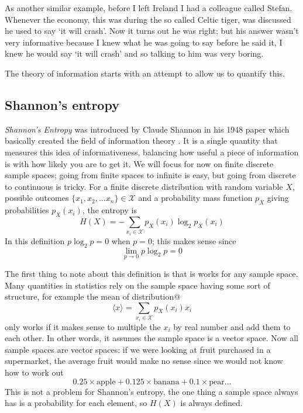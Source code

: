 \documentclass[12pt]{article}
\begin{document}
As another similar example, before I left Ireland I had a colleague
called Stefan. Whenever the economy, this was during the so called
Celtic tiger, was discussed he used to say \lq{}it will
crash\rq{}. Now it turns out he was right; but his answer wasn't very
informative because I knew what he was going to say before he said it,
I knew he would say \lq{}it will crash\rq{} and so talking to him was
very boring. 

The theory of information starts with an attempt to allow us to
quantify this. 

\subsection*{Shannon's entropy}


\textsl{Shannon's Entropy} was introduced by Claude Shannon in his
1948 paper which basically created the field of information theory
\citep{Shannon1948}. It is a single quantity that measures this idea of
informativeness, balancing how useful a piece of information is with
how likely you are to get it. We will focus for now on finite discrete
sample spaces; going from finite spaces to infinite is easy, but going
from discrete to continuous is tricky. For a finite discrete
distribution with random variable $X$, possible outcomes
$\{x_1,x_2,\ldots x_n\}\in\mathcal{X}$ and a probability mass function
$p_X$ giving probabilities $p_X(x_i)$, the entropy is
\begin{equation}
H(X)=-\sum_{x_i\in \mathcal{X}}{p_X(x_i)\log_2p_X(x_i)}
\end{equation}
In this definition $p\log_2{p}=0$ when $p=0$; this makes sense since
\begin{equation}
\lim_{p\rightarrow 0}p\log_2{p}=0
\end{equation}


The first thing to note about this definition is that is works for any
sample space. Many quantities in statistics rely on the sample space
having some sort of structure, for example the mean of distribution@
\begin{equation}
\langle x\rangle = \sum_{x_i\in \mathcal{X}}{p_X(x_i)x_i}
\end{equation}
only works if it makes sense to multiple the $x_i$ by real number and
add them to each other. In other words, it assumes the sample space is
a vector space. Now all sample spaces are vector spaces: if we were
looking at fruit purchased in a supermarket, the average fruit would
make no sense since we would not know how to work out
\begin{equation}
0.25\times \mbox{apple}+0.125\times \mbox{banana}+0.1\times \mbox{pear}\ldots
\end{equation}
This is not a problem for Shannon's entropy, the one
thing a sample space always has is a probability for each element, so
$H(X)$ is always defined.
\end{document}
